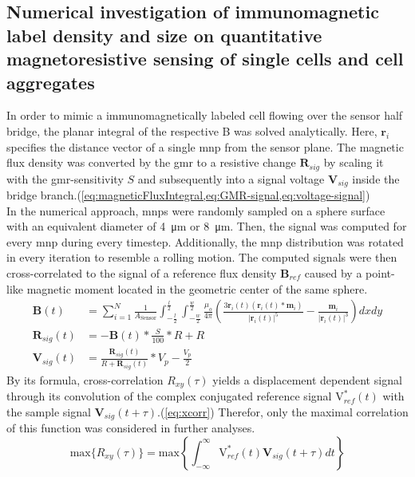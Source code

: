 \subsection{Numerical investigation of immunomagnetic label density and size on quantitative magnetoresistive sensing of single cells and cell aggregates}
In order to mimic a immunomagnetically labeled cell flowing over the sensor half bridge, the planar integral of the respective \acrfull{B} was solved analytically. Here, $\mathbf{r}_i$ specifies the distance vector of a single \gls{mnp} from the sensor plane. The magnetic flux density was converted by the \gls{gmr} to a resistive change $\mathbf{R}_{sig}$ by scaling it with the \gls{gmr}-sensitivity $S$ and subsequently into a signal voltage $\mathbf{V}_{sig}$ inside the bridge branch.(\cref{eq:magneticFluxIntegral,eq:GMR-signal,eq:voltage-signal})\\
In the numerical approach, \glspl{mnp} were randomly sampled on a sphere surface with an equivalent diameter of \SI{4}{\micro\meter} or \SI{8}{\micro\meter}. Then, the signal was computed for every \gls{mnp} during every timestep. Additionally, the \gls{mnp} distribution was rotated in every iteration to resemble a rolling motion. The computed signals were then cross-correlated to the signal of a reference flux density $\mathbf{B}_{ref}$ caused by a point-like magnetic moment located in the geometric center of the same sphere.
\begin{align}
	\mathbf{B}(t) &= \sum_{i=1}^{N} \frac{1}{A_{\mathrm{Sensor}}} \int_{-\frac{l}{2}}^{\frac{l}{2}} \int_{-\frac{w}{2}}^{\frac{w}{2}} \frac{\mu_{o}}{4 \pi}\left(\frac{3 \mathbf{r}_{i}(t)\left(\mathbf{r}_{i}(t) * \mathbf{m}_{i}\right)}{\left|\mathbf{r}_{i}(t)\right|^{5}}-\frac{\mathbf{m}_{i}}{\left|\mathbf{r}_{i}(t)\right|^{3}}\right) dx dy \label{eq:magneticFluxIntegral} \\
	\mathbf{R}_{sig}(t) &= - \mathbf{B}(t) * \frac{S}{100} * R + R \label{eq:GMR-signal}\\
	\mathbf{V}_{sig}(t) &= \frac{\mathbf{R}_{sig}(t)}{R + \mathbf{R}_{sig}(t)}*V_p - \frac{V_p}{2} \label{eq:voltage-signal}
\end{align}
By its formula, cross-correlation $R_{x y}(\tau)$ yields a displacement dependent signal through its convolution of the complex conjugated reference signal $\mathrm{V}_{ref}^{*}(t)$ with the sample signal $\mathbf{V}_{sig}(t+\tau)$.(\cref{eq:xcorr}) Therefor, only the maximal correlation of this function was considered in further analyses.
\begin{equation}
	\mathrm{max}\{R_{x y}(\tau)\}=\mathrm{max}\left\{\int_{-\infty}^{\infty} \mathrm{V}_{ref}^{*}(t) \mathbf{V}_{sig}(t+\tau) dt \right\} \label{eq:xcorr}
\end{equation}

